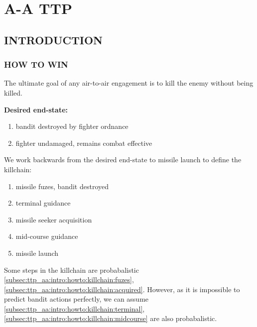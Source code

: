 \chapter{A-A TTP}
\localtableofcontents
\thispagestyle{plain}
\cleardoublepage

\section{INTRODUCTION}
\subsection{HOW TO WIN}
\begin{tcoloritemize}
    \blueitem[Goal]
    The ultimate goal of any air-to-air engagement is to kill the enemy without being killed. 

    \medskip
    \textbf{Desired end-state:}
    \begin{enumerate}[label=\bfseries(\arabic*)]
        \item bandit destroyed by fighter ordnance
        \label{subsec:ttp_aa:intro:howto:endstate:bandit}
        \item fighter undamaged, remains combat effective
        \label{subsec:ttp_aa:intro:howto:endstate:fighter}
    \end{enumerate}

    We work backwards from the desired end-state 
    to missile launch to define the killchain:
    \begin{enumerate}[label=\textbf{(\alph*)}]
        \item missile fuzes, bandit destroyed
        \label{subsec:ttp_aa:intro:howto:killchain:fuzes}
        \item terminal guidance
        \label{subsec:ttp_aa:intro:howto:killchain:terminal}
        \item missile seeker acquisition
        \label{subsec:ttp_aa:intro:howto:killchain:acquired}
        \item mid-course guidance
        \label{subsec:ttp_aa:intro:howto:killchain:midcourse}
        \item missile launch
        \label{subsec:ttp_aa:intro:howto:killchain:launch}
    \end{enumerate}

    Some steps in the killchain are probabalistic 
    \ref{subsec:ttp_aa:intro:howto:killchain:fuzes},
    \ref{subsec:ttp_aa:intro:howto:killchain:acquired}.
    However, as it is impossible to predict bandit actions perfectly, 
    we can assume 
    \ref{subsec:ttp_aa:intro:howto:killchain:terminal},
    \ref{subsec:ttp_aa:intro:howto:killchain:midcourse}
    are also probabalistic.


\end{tcoloritemize}
